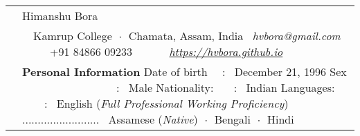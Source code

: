 \documentclass[a4paper, 11pt]{article}
\newenvironment{SectionTable}[1]{
	\renewcommand*{\arraystretch}{1.7}
	\setlength{\tabcolsep}{10pt}
	\begin{longtable}{Rp{5.2in}} & #1 \\}
{\end{longtable}\vspace{-.3cm}}
\begin{document}

\begin{SectionTable}{\Huge \color{Bittersweet} Himanshu Bora}
& 
\faMapMarker \ \ Kamrup College $\;\boldsymbol{\cdot}\;$ Chamata, Assam, India \newline
\faEnvelope \  \textit{hvbora@gmail.com} \ \ \ \  \faPhone \ +91 84866 09233 \ \ \ \ 
\faGlobe \ \ \href{https://hvbora.github.io}{\textit{https://hvbora.github.io}}  \\
		
&
{\textbf {Personal Information}} \newline
Date of birth \ \ : \ December 21, 1996 \newline
Sex \ \ \ \ \ \ \ \ \ \ \ \ \ \ \ \ \ : \ Male \newline
Nationality: \ \ \ : \ Indian \newline
Languages: \ \ \ \ : \ English (\textit{Full Professional Working Proficiency}) \newline 
{\color{white} .........................} \ Assamese (\textit{Native}) $\;\boldsymbol{\cdot}\;$ Bengali $\;\boldsymbol{\cdot}\;$ Hindi 
\end{SectionTable}
\end{document}
